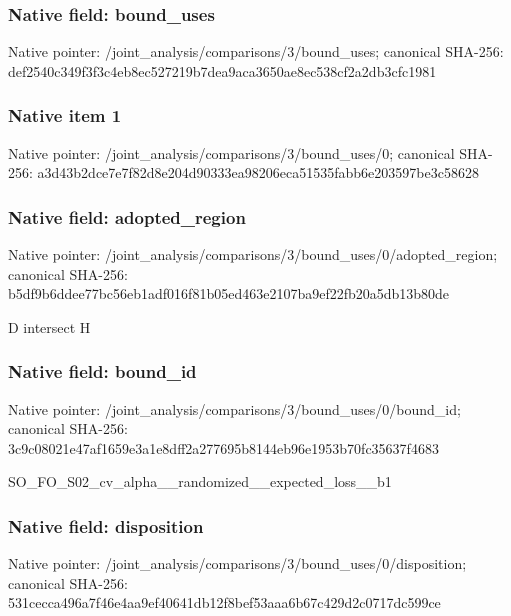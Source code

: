 \documentclass[10pt,a4paper]{article}
\begin{document}
\subsubsection{Native field: bound\_uses}


Native pointer: /joint\_analysis/comparis\allowbreak{}ons/3/bound\_uses; canonical SHA-256: def2540c349f3f3c4eb8ec52\allowbreak{}7219b7dea9aca3650ae8ec53\allowbreak{}8cf2a2db3cfc1981



\subsubsection{Native item 1}


Native pointer: /joint\_analysis/comparis\allowbreak{}ons/3/bound\_uses/0; canonical SHA-256: a3d43b2dce7e7f82d8e204d9\allowbreak{}0333ea98206eca51535fabb6\allowbreak{}e203597be3c58628



\subsubsection{Native field: adopted\_region}


Native pointer: /joint\_analysis/comparis\allowbreak{}ons/3/bound\_uses/0/adopt\allowbreak{}ed\_region; canonical SHA-256: b5df9b6ddee77bc56eb1adf0\allowbreak{}16f81b05ed463e2107ba9ef2\allowbreak{}2fb20a5db13b80de


D intersect H


\subsubsection{Native field: bound\_id}


Native pointer: /joint\_analysis/comparis\allowbreak{}ons/3/bound\_uses/0/bound\allowbreak{}\_id; canonical SHA-256: 3c9c08021e47af1659e3a1e8\allowbreak{}dff2a277695b8144eb96e195\allowbreak{}3b70fc35637f4683


SO\_FO\_S02\_cv\_alpha\_\_rand\allowbreak{}omized\_\_expected\_loss\_\_b\allowbreak{}1


\subsubsection{Native field: disposition}


Native pointer: /joint\_analysis/comparis\allowbreak{}ons/3/bound\_uses/0/dispo\allowbreak{}sition; canonical SHA-256: 531cecca496a7f46e4aa9ef4\allowbreak{}0641db12f8bef53aaa6b67c4\allowbreak{}29d2c0717dc599ce
\end{document}

